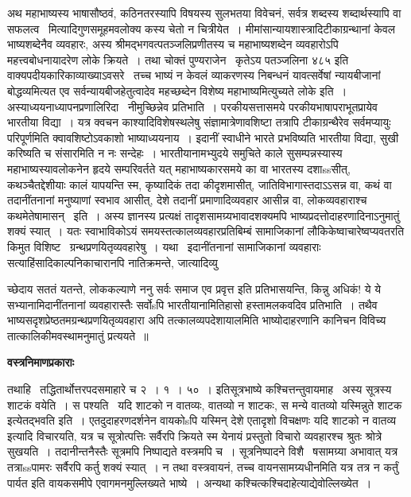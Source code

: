 \documentclass[11pt, openany]{book}
\begin{document}
अथ महाभाष्यस्य भाषासौष्ठवं, कठिनतरस्यापि विषयस्य सुलभतया विवेचनं, सर्वत्र शब्दस्य शब्दार्थस्यापि वा सफलत्व \textendash\ मित्यादिगुणसमूहमवलोक्य कस्य चेतो न चित्रीयेत~। मीमांसान्यायशास्त्रादिटीकाग्रन्थानां केवल भाष्यशब्देनैव व्यवहारः, अस्य श्रीमद्भगवत्पतञ्जलिप्रणीतस्य च महाभाष्यशब्देन व्यवहारोऽपि महत्त्वबोधनायादरेण लोके क्रियते~। तथा चोक्तं पुण्यराजेन \textendash\ {\qt कृतेऽय पतञ्जलिना} ४८५ इति वाक्यपदीयकारिकाव्याख्याऽवसरे \textendash\ {\qt तच्च भाष्यं न केवलं व्याकरणस्य निबन्धनं यावत्सर्वेषां न्यायबीजानां बोद्धव्यमित्यत एव सर्वन्यायबीजहेतुत्वादेव महच्छब्देन विशेष्य महाभाष्यमित्युच्यते लोके} इति~। अस्याध्ययनाध्यापनप्रणालिरिदा \textendash\ नीमुच्छिन्नेव प्रतिभाति~। परकीयसत्तासमये परकीयभाषापराभूतप्रायेव भारतीया विद्या~। यत्र क्वचन काश्यादिविशेषस्थलेषु संज्ञामात्रेणावशिष्टा तत्रापि टीकाग्रन्थैरेव सर्वमप्यायुः परिपूर्णमिति क्वावशिष्टोऽवकाशो भाष्याध्ययनाय~। इदानीं स्वाधीने भारते प्रभविष्यति भारतीया विद्या, सुखी करिष्यति च संसारमिति न नः सन्देहः~। भारतीयानामभ्युदये समुचिते काले सुसम्पन्नस्यास्य महाभाष्यस्यावलोकनेन हृदये सम्परिवर्तते यत् महाभाष्यकारसमये का वा भारतस्य दशाssसीत्, कथञ्चैतद्देशीयाः कालं यापयन्ति स्म, कृष्यादिकं तदा कीदृशमासीत्, जातिविभागास्तदाऽऽसन्न वा, कथं वा तदानींतनानां मनुष्याणां स्वभाव आसीत्, देशे तदानीं प्रमाणादिव्यवहार आसीन्न वा, लोकव्यवहाराश्च कथमेतेषामासन् \textendash\ इति~। अस्य ज्ञानस्य प्रत्यक्षं तादृशसामग्र्यभावादशक्यमपि भाष्यप्रदत्तोदाहरणादिनाऽनुमातुं शक्यं स्यात्~। यतः स्वाभाविकोऽयं समयस्तत्कालव्यवहारप्रतिबिम्बं सामाजिकानां लौकिकेष्वाचारेष्वप्यवतरति किमुत विशिष्ट \textendash\ ग्रन्थप्रणयितृव्यवहारेषु~। यथा \textendash\ इदानींतनानां सामाजिकानां व्यवहाराः सत्याहिंसादिकाल्पनिकाचारानपि नातिक्रमन्ते, जात्यादिव्यु \textendash\

\newpage

\noindent
च्छेदाय सततं यतन्ते, लोककल्याणे ननु सर्वः समाज एव प्रवृत्त इति प्रतिभासयन्ति, किन्नु अधिकं! ये ये सभ्यानामिदानींतनानां व्यवहारास्तैः सर्वोsपि भारतीयानामितिहासो हस्तामलकवदिव प्रतिभाति~। तथैव भाष्यसदृशप्रेष्ठतमग्रन्थप्रणयितृव्यवहारा अपि तत्कालव्यपदेशायालमिति भाष्योदाहरणानि कानिचन विविच्य तात्कालिकीमवस्थामनुमातुं प्रत्ययते~॥

\begin{center}
\textbf{\Large वस्त्रनिमाणप्रकाराः \textendash\ }
\end{center}

तथाहि \textendash\ तद्धितार्थोत्तरपदसमाहारे च २~। १~। ५०~। इतिसूत्रभाष्ये {\qt कश्चित्तन्तुवायमाह \textendash\ अस्य सूत्रस्य शाटकं वयेति~। स पश्यति \textendash\ यदि शाटको न वातव्यः, वातव्यो न शाटकः, स मन्ये वातव्यो यस्मिन्नुते शाटक इत्येतद्भवति} इति~। एतदुदाहरणदर्शनेन वायकोsपि यस्मिन् देशे एतादृशो विचक्षणः यदि शाटको न वातव्य इत्यादि विचारयति, यत्र च सूत्रोत्पत्तिः सर्वैरपि क्रियते स्म येनायं प्रस्तुतो विचारो व्यवहारश्च श्रुतः श्रोत्रे सुखयति~। तदानीन्तनैस्तैः सूत्रमपि निष्पाद्यते वस्त्रमपि च~। सूत्रनिष्पादने विशै \textendash\ षसामग्र्या अभावात् यत्र तत्राssपामरः सर्वैरपि कर्तु शक्यं स्यात्~। न तथा वस्त्रवायनं, तच्च वायनसामग्र्यधीनमिति यत्र तत्र न कर्तुं पार्यत इति वायकसमीपे एवागमनमुल्लिख्यते भाष्ये~। अन्यथा कश्चित्कश्चिदाहेत्याद्येवोल्लिख्येत~।\\
\end{document}

